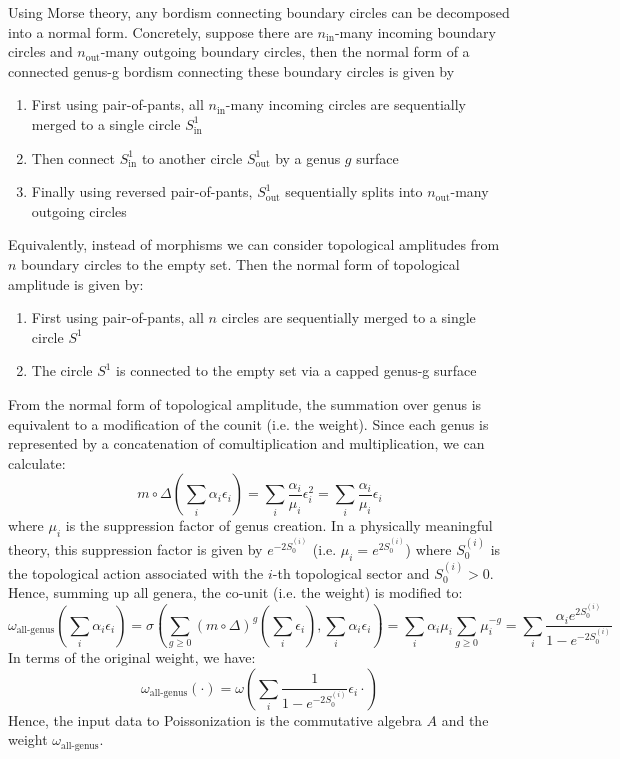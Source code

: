 \documentclass[a4paper,11pt]{article}
\theoremstyle{definition}
\numberwithin{equation}{section}
\begin{document}
Using Morse theory, any bordism connecting boundary circles can be decomposed into a normal form. Concretely, suppose there are $n_\text{in}$-many incoming boundary circles and $n_\text{out}$-many outgoing boundary circles, then the normal form of a connected genus-g bordism connecting these boundary circles is given by
\begin{enumerate}
    \item First using pair-of-pants, all $n_\text{in}$-many incoming circles are sequentially merged to a single circle $S^1_\text{in}$
    \item Then connect $S^1_\text{in}$ to another circle $S^1_\text{out}$ by a genus $g$ surface
    \item Finally using reversed pair-of-pants, $S^1_\text{out}$ sequentially splits into $n_\text{out}$-many outgoing circles
\end{enumerate}
Equivalently, instead of morphisms we can consider topological amplitudes from $n$ boundary circles to the empty set. Then the normal form of topological amplitude is given by:
\begin{enumerate}
    \item First using pair-of-pants, all $n$ circles are sequentially merged to a single circle $S^1$
    \item The circle $S^1$ is connected to the empty set via a capped genus-g surface
\end{enumerate}
From the normal form of topological amplitude, the summation over genus is equivalent to a modification of the counit (i.e. the weight). Since each genus is represented by a concatenation of comultiplication and multiplication, we can calculate:
\begin{equation}
    m\circ\Delta(\sum_i\alpha_i\epsilon_i) = \sum_i\frac{\alpha_i}{\mu_i}\epsilon_i^2 = \sum_i\frac{\alpha_i}{\mu_i}\epsilon_i
\end{equation}
where $\mu_i$ is the suppression factor of genus creation. In a physically meaningful theory, this suppression factor is given by $e^{-2S_0^{(i)}}$ (i.e. $\mu_i = e^{2S_0^{(i)}}$) where $S_0^{(i)}$ is the topological action associated with the $i$-th topological sector and $S_0^{(i)} > 0$. Hence, summing up all genera, the co-unit (i.e. the weight) is modified to:
\begin{equation}
    \omega_\text{all-genus}(\sum_i\alpha_i\epsilon_i) = \sigma(\sum_{g\geq 0}(m\circ\Delta)^g(\sum_i\epsilon_i), \sum_i\alpha_i\epsilon_i) = \sum_i\alpha_i\mu_i\sum_{g\geq 0}\mu_i^{-g} = \sum_i\frac{\alpha_ie^{2S_0^{(i)}}}{1 - e^{-2S_0^{(i)}}}
\end{equation}
In terms of the original weight, we have:
\begin{equation}
    \omega_\text{all-genus}(\cdot) = \omega(\sum_i\frac{1}{1 - e^{-2S_0^{(i)}}}\epsilon_i\cdot)
\end{equation}
Hence, the input data to Poissonization is the commutative algebra $A$ and the weight $\omega_\text{all-genus}$.
\end{document}

